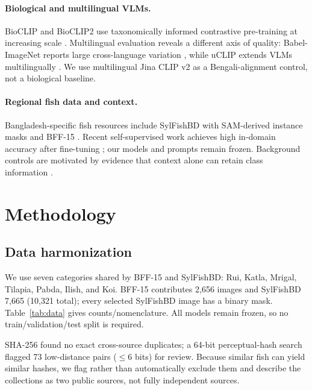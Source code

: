 \documentclass{article}
\begin{document}
\paragraph{Biological and multilingual VLMs.}
BioCLIP and BioCLIP2 use taxonomically informed contrastive pre-training at increasing scale \citep{stevens2024bioclip,gu2025bioclip2}. Multilingual evaluation reveals a different axis of quality: Babel-ImageNet reports large cross-language variation \citep{geigle2024babel}, while uCLIP extends VLMs multilingually \citep{chung2026uclip}. We use multilingual Jina CLIP v2 \citep{koukounas2024jinaclipv2} as a Bengali-alignment control, not a biological baseline.

\paragraph{Regional fish data and context.}
Bangladesh-specific fish resources include SylFishBD with SAM-derived instance masks \citep{absar2026sylfish,kirillov2023sam} and BFF-15 \citep{bff15}. Recent self-supervised work achieves high in-domain accuracy after fine-tuning \citep{siam2025freshwater}; our models and prompts remain frozen. Background controls are motivated by evidence that context alone can retain class information \citep{xiao2021backgrounds}.

\section{Methodology}
\subsection{Data harmonization}
We use seven categories shared by BFF-15 and SylFishBD: Rui, Katla, Mrigal, Tilapia, Pabda, Ilish, and Koi. BFF-15 contributes 2,656 images and SylFishBD 7,665 (10,321 total); every selected SylFishBD image has a binary mask. Table~\ref{tab:data} gives counts/nomenclature. All models remain frozen, so no train/validation/test split is required.

SHA-256 found no exact cross-source duplicates; a 64-bit perceptual-hash search flagged 73 low-distance pairs ($\leq 6$ bits) for review. Because similar fish can yield similar hashes, we flag rather than automatically exclude them and describe the collections as two public sources, not fully independent sources.
\end{document}
